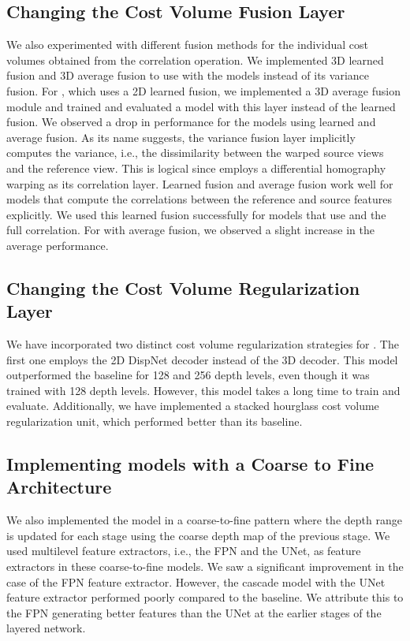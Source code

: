 \subsection*{Changing the Cost Volume Fusion Layer}
We also experimented with different fusion methods for the individual cost volumes obtained from the correlation operation. We implemented 3D learned fusion and 3D average fusion to use with the {\mvsn} models instead of its variance fusion. For {\rmvd}, which uses a 2D learned fusion, we implemented a 3D average fusion module and trained and evaluated a model with this layer instead of the learned fusion. We observed a drop in performance for the {\mvsn} models using learned and average fusion. As its name suggests, the variance fusion layer implicitly computes the variance, i.e., the dissimilarity between the warped source views and the reference view. This is logical since {\mvsn} employs a differential homography warping as its correlation layer. Learned fusion and average fusion work well for models that compute the correlations between the reference and source features explicitly. We used this learned fusion successfully for models that use {\gwc} and the full correlation. For {\rmvd} with average fusion, we observed a slight increase in the average performance. \par

\subsection*{Changing the Cost Volume Regularization Layer}
We have incorporated two distinct cost volume regularization strategies for {\mvsn}. The first one employs the 2D DispNet decoder instead of the 3D {\mvsn} decoder. This model outperformed the baseline {\mvsn} for 128 and 256 depth levels, even though it was trained with 128 depth levels. However, this model takes a long time to train and evaluate. Additionally, we have implemented a stacked hourglass cost volume regularization unit, which performed better than its baseline. \par

\subsection*{Implementing models with a Coarse to Fine Architecture}
We also implemented the {\mvsn} model in a coarse-to-fine pattern where the depth range is updated for each stage using the coarse depth map of the previous stage. We used multilevel feature extractors, i.e., the FPN and the UNet, as feature extractors in these coarse-to-fine models. We saw a significant improvement in the case of the FPN feature extractor. However, the cascade model with the UNet feature extractor performed poorly compared to the baseline. We attribute this to the FPN generating better features than the UNet at the earlier stages of the layered network. \par

